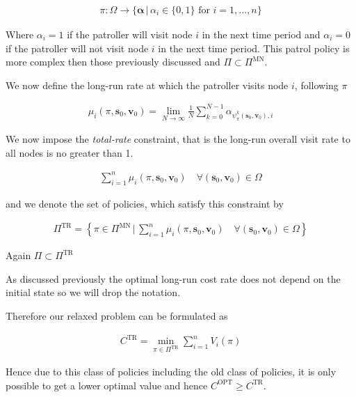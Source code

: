 \documentclass[a4paper,10pt]{article}
\theoremstyle{definition}
\theoremstyle{definition}
\theoremstyle{remark}
\theoremstyle{definition}
\begin{document}
\begin{align*}
\pi : \Omega \rightarrow \{\bm{\alpha} \, | \, \alpha_{i} \in \{0,1 \} \text{ for } i=1,...,n \}
\end{align*}

Where $\alpha_{i}=1$ if the patroller will visit node $i$ in the next time period and $\alpha_{i}=0$ if the patroller will not visit node $i$ in the next time period. This patrol policy is more complex then those previously discussed and $\Pi \subset \Pi^{\text{MN}}$.

We now define the long-run rate at which the patroller visits node $i$, following $\pi$

\begin{align*}
\mu_{i}(\pi,\bm{s}_{0},\bm{v}_{0})=\lim\limits_{N \rightarrow \infty} \frac{1}{N} \sum\limits_{k=0}^{N-1} \alpha_{\psi_{\pi}^{k}(\bm{s}_{0},\bm{v}_{0}),i}
\end{align*}

We now impose the \textit{total-rate} constraint, that is the long-run overall visit rate to all nodes is no greater than 1. 

\begin{align*}
\sum\limits_{i=1}^{n} \mu_{i}(\pi,\bm{s}_{0},\bm{v}_{0}) \quad \forall (\bm{s}_{0},\bm{v}_{0}) \in \Omega
\end{align*}

and we denote the set of policies, which satisfy this constraint by

\begin{align*}
\Pi^{\text{TR}}=\left\{ \pi \in \Pi^{\text{MN}} \, \bigg| \, \sum\limits_{i=1}^{n} \mu_{i}(\pi,\bm{s}_{0},\bm{v}_{0}) \quad \forall (\bm{s}_{0},\bm{v}_{0}) \in \Omega \right\}
\end{align*}

Again $\Pi \subset \Pi^{\text{TR}}$

As discussed previously the optimal long-run cost rate does not depend on the initial state so we will drop the notation.

Therefore our relaxed problem can be formulated as

\begin{align*}
C^{\text{TR}}=\min_{\pi \in \Pi^{\text{TR}}} \sum\limits_{i=1}^{n} V_{i}(\pi)
\end{align*}

Hence due to this class of policies including the old class of policies, it is only possible to get a lower optimal value and hence $C^{\text{OPT}} \geq C^{\text{TR}}$.
\end{document}
